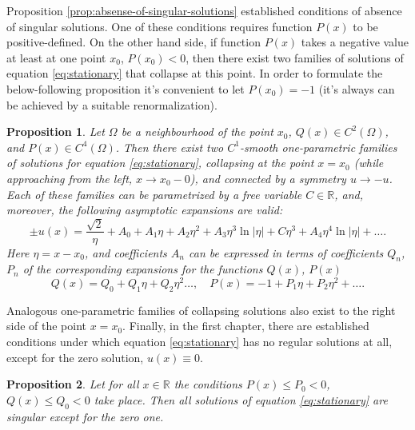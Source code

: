 \documentclass[candidate, href, colorlinks]{disser}
\newtheorem{proposition}{Proposition}
\begin{document}
Proposition \ref{prop:absense-of-singular-solutions} established conditions of absence of singular solutions.
One of these conditions requires function $P(x)$ to be positive-defined.
On the other hand side, if function $P(x)$ takes a negative value at least at one point $x_0$, $P(x_0) < 0$, then there exist two families of solutions of equation \eqref{eq:stationary} that collapse at this point.
In order to formulate the below-following proposition it's convenient to let $P(x_0) = -1$ (it's always can be achieved by a suitable renormalization).

\begin{proposition}
\label{prop:singular-families}
	Let $\Omega$ be a neighbourhood of the point $x_0$, $Q(x) \in C^2(\Omega)$, and $P(x) \in C^4(\Omega)$.
	Then there exist two $C^1$-smooth one-parametric families of solutions for equation \eqref{eq:stationary}, collapsing at the point $x = x_0$ (while approaching from the left, $x \to x_0{-}0$), and connected by a symmetry $u \to -u$.
	Each of these families can be parametrized by a free variable $C \in \mathbb{R}$, and, moreover, the following asymptotic expansions are valid:
	\begin{equation}
		\pm u(x) = \dfrac{\sqrt{2}}{\eta} + A_0 + A_1 \eta + A_2 \eta^2 + A_3 \eta^3 \ln |\eta| + C \eta^3+ A_4 \eta^4 \ln |\eta| + \dots.
	\label{eq:expansion}
	\end{equation}
	Here $\eta = x - x_0$, and coefficients $A_n$ can be expressed in terms of coefficients $Q_n$, $P_n$ of the corresponding expansions for the functions $Q(x)$, $P(x)$
	\begin{equation}
		Q(x) = Q_0 + Q_1 \eta + Q_2 \eta^2 \dots, \quad P(x) = -1 + P_1 \eta + P_2 \eta^2 + \dots.
	\end{equation}
\end{proposition}

Analogous one-parametric families of collapsing solutions also exist to the right side of the point $x = x_0$.
Finally, in the first chapter, there are established conditions under which equation \eqref{eq:stationary} has no regular solutions at all, except for the zero solution, $u(x) \equiv 0$.

\begin{proposition}
\label{prop:all-solutions-are-singular}
 	Let for all $x \in \mathbb{R}$ the conditions $P(x) \le P_0 < 0$, $Q(x) \le Q_0 < 0$ take place.
 	Then all solutions of equation \eqref{eq:stationary} are singular except for the zero one.
\end{proposition}
\end{document}
